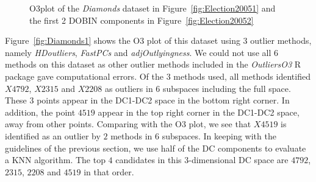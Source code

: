 \documentclass[11pt]{article}
\begin{document}
\begin{figure}
	\centering
	\caption{O3plot of the \textit{Diamonds} dataset in Figure~\ref{fig:Election20051} and the first 2 DOBIN components in Figure~\ref{fig:Election20052} }
	\label{fig:Diamonds}
\end{figure}

Figure~\ref{fig:Diamonds1} shows the O3 plot of this dataset using $3$ outlier methods, namely \textit{HDoutliers}, \textit{FastPCs} and \textit{adjOutlyingness}. We could not use all $6$ methods on this dataset as other outlier methods included in the \textit{OutliersO3} R package gave computational errors. Of the $3$ methods used, all methods identified $X4792$, $X2315$ and $X2208$ as outliers in 6 subspaces including the full space. These $3$ points appear in the DC1-DC2 space in the bottom right corner. In addition, the point $4519$ appear in the top right corner in the DC1-DC2 space, away from other points. Comparing with the O3 plot, we see that $X4519$ is identified as an outlier by $2$ methods in $6$ subspaces. In keeping with the guidelines of the previous section, we use half of the DC components to evaluate a KNN algorithm. The top $4$ candidates in this $3$-dimensional DC space are $4792$, $2315$, $2208$ and $4519$ in that order. \\
\end{document}
